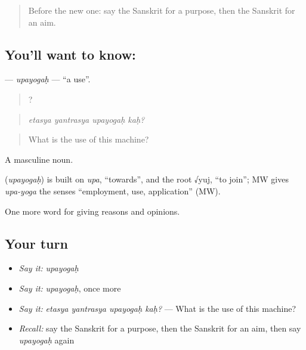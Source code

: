 \label{lesson:SA-C341-upayogah}



\begin{quote}
Before the new one: say the Sanskrit for a purpose, then the Sanskrit for an aim.
\end{quote}

\subsection*{You'll want to know: }
\textbf{} — \emph{upayogaḥ} — \textquotedblleft{}a use\textquotedblright{}.

\begin{quote}
   ?
\end{quote}

\begin{quote}
\emph{etasya yantrasya upayogaḥ kaḥ?}
\end{quote}

\begin{quote}
What is the use of this machine?
\end{quote}

A masculine noun.

\begin{cousinweb}
\textbf{} (\emph{upayogaḥ}) is built on \emph{upa}, \textquotedblleft{}towards\textquotedblright{}, and the root √yuj, \textquotedblleft{}to join\textquotedblright{}; MW gives \emph{upa-yoga} the senses \textquotedblleft{}employment, use, application\textquotedblright{} (MW).
\end{cousinweb}

\begin{grammarlens}[title={What you've built}]
One more word for giving reasons and opinions.
\end{grammarlens}

\subsection*{Your turn}
\begin{itemize}
\raggedright
  \item \emph{Say it:} \emph{upayogaḥ}
  \item \emph{Say it:} \emph{upayogaḥ}, once more
  \item \emph{Say it:} \emph{etasya yantrasya upayogaḥ kaḥ?} — What is the use of this machine?
  \item \emph{Recall:} say the Sanskrit for a purpose, then the Sanskrit for an aim, then say \emph{upayogaḥ} again
\end{itemize}

